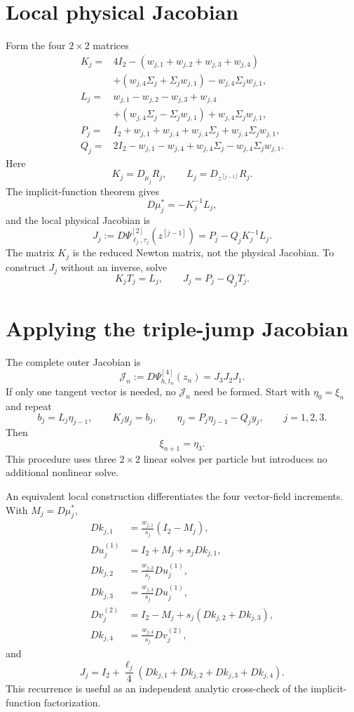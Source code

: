 \documentclass[11pt,a4paper]{article}
\newcommand{\Id}{I}
\begin{document}
\section{Local physical Jacobian}

Form the four $2\times2$ matrices
\begin{align*}
 K_j={}&4\Id_2-(w_{j,1}+w_{j,2}+w_{j,3}+w_{j,4})\\
       &+(w_{j,4}\Sigma_j+\Sigma_jw_{j,1})
        -w_{j,4}\Sigma_jw_{j,1},\\[1mm]
 L_j={}&w_{j,1}-w_{j,2}-w_{j,3}+w_{j,4}\\
       &+(w_{j,4}\Sigma_j-\Sigma_jw_{j,1})
        +w_{j,4}\Sigma_jw_{j,1},\\[1mm]
 P_j={}&\Id_2+w_{j,1}+w_{j,4}
          +w_{j,4}\Sigma_j+w_{j,4}\Sigma_jw_{j,1},\\[1mm]
 Q_j={}&2\Id_2-w_{j,1}-w_{j,4}
          +w_{j,4}\Sigma_j-w_{j,4}\Sigma_jw_{j,1}.
\end{align*}
Here
\[
 K_j=D_{\mu_j}R_j,
 \qquad
 L_j=D_{z^{[j-1]}}R_j.
\]
The implicit-function theorem gives
\[
 D\mu_j^*=-K_j^{-1}L_j,
\]
and the local physical Jacobian is
\[
 \boxed{
 J_j:=D\Psi^{[2]}_{\ell_j,\tau_j}(z^{[j-1]})
 =P_j-Q_jK_j^{-1}L_j.
 }
\]
The matrix $K_j$ is the reduced Newton matrix, not the physical Jacobian.  To
construct $J_j$ without an inverse, solve
\[
 K_jT_j=L_j,
 \qquad
 J_j=P_j-Q_jT_j.
\]

\section{Applying the triple-jump Jacobian}

The complete outer Jacobian is
\[
 \boxed{
 \mathcal J_n
 :=D\Psi^{[4]}_{h,t_n}(z_n)=J_3J_2J_1.
 }
\]
If only one tangent vector is needed, no $\mathcal J_n$ need be formed.  Start
with $\eta_0=\xi_n$ and repeat
\[
 b_j=L_j\eta_{j-1},
 \qquad
 K_jy_j=b_j,
 \qquad
 \eta_j=P_j\eta_{j-1}-Q_jy_j,
 \qquad j=1,2,3.
\]
Then
\[
 \boxed{\xi_{n+1}=\eta_3.}
\]
This procedure uses three $2\times2$ linear solves per particle but introduces
no additional nonlinear solve.

An equivalent local construction differentiates the four vector-field
increments.  With $M_j=D\mu_j^*$,
\begin{align*}
 Dk_{j,1}&=\frac{w_{j,1}}{s_j}(\Id_2-M_j),\\
 Du_j^{(1)}&=\Id_2+M_j+s_jDk_{j,1},\\
 Dk_{j,2}&=\frac{w_{j,2}}{s_j}Du_j^{(1)},\\
 Dk_{j,3}&=\frac{w_{j,3}}{s_j}Du_j^{(1)},\\
 Dv_j^{(2)}&=\Id_2-M_j+s_j(Dk_{j,2}+Dk_{j,3}),\\
 Dk_{j,4}&=\frac{w_{j,4}}{s_j}Dv_j^{(2)},
\end{align*}
and
\[
 J_j=\Id_2+\frac{\ell_j}{4}
 (Dk_{j,1}+Dk_{j,2}+Dk_{j,3}+Dk_{j,4}).
\]
This recurrence is useful as an independent analytic cross-check of the
implicit-function factorization.
\end{document}
